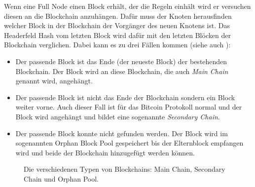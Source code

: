 \documentclass[ngerman,runningheads,a4paper]{llncs}[2018/03/10]
\begin{document}
Wenn eine Full Node einen Block erhält, der die Regeln einhält wird er versuchen diesen an die Blockchain anzuhängen. Dafür muss der Knoten herausfinden welcher Block in der Blockchain der Vorgänger des neuen Knotens ist. Das Headerfeld Hash vom letzten Block wird dafür mit den letzten Blöcken der Blockchain verglichen. Dabei kann es zu drei Fällen kommen (siehe auch ):

\begin{itemize}

\item Der passende Block ist das Ende (der neueste Block) der bestehenden Blockchain. Der Block wird an diese Blockchain, die auch \textit{Main Chain} genannt wird, angehängt.

\item Der passende Block ist nicht das Ende der Blockchain sondern ein Block weiter vorne. Auch dieser Fall ist für das Bitcoin Protokoll normal und der Block wird angehängt und bildet eine sogenannte \textit{Secondary Chain}.

\item Der passende Block konnte nicht gefunden werden. Der Block wird im sogenannten Orphan Block Pool gespeichert bis der Elternblock empfangen wird und beide der Blockchain hinzugefügt werden können.

\end{itemize}

\begin{figure}
  \centering
  \caption{Die verschiedenen Typen von Blockchains: Main Chain, Secondary Chain und Orphan Pool.}
  \label{fig:blockchainTypes}
\end{figure}
\end{document}
